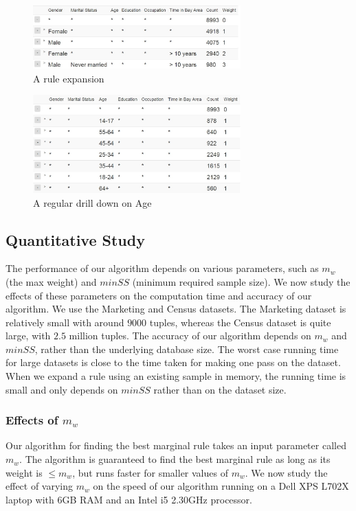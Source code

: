 \documentclass[10pt,journal,compsoc]{IEEEtran}
\begin{document}
\begin{figure}
\centering
\includegraphics[width=80mm,frame]{graphs/screenshots6col/empty_expansion.jpg}
\caption{A rule expansion \label{fig:uiexamplerule}}
\vspace{-10pt}
\end{figure}

\begin{figure}
\centering
\includegraphics[width=80mm,frame]{graphs/screenshots6col/age_drilldown.jpg}
\caption{A regular drill down on Age\label{fig:drilldownexample}}
\vspace{-10pt}
\end{figure}

\subsection{Quantitative Study}\label{sec:quantitative_study}
The performance of our algorithm depends on various parameters, such as $m_w$ (the max weight) and $minSS$ (minimum required sample size). We now study the effects of these parameters on the computation time and accuracy of our algorithm. We use the Marketing and Census datasets. The Marketing dataset is relatively small with around $9000$ tuples, whereas the Census dataset is quite large, with $2.5$ million tuples. The accuracy of our algorithm depends on $m_w$ and $minSS$, rather than the underlying database size. The worst case running time for large datasets is close to the time taken for making one pass on the dataset. When we expand a rule using an existing sample in memory, the running time is small and only depends on $minSS$ rather than on the dataset size.

\subsubsection{Effects of $m_w$}
Our algorithm for finding the best marginal rule takes an input parameter called $m_w$. The algorithm is guaranteed to find the best marginal rule as long as its weight is $\leq m_w$, but runs faster for smaller values of $m_w$. We now study the effect of varying $m_w$ on the speed of our algorithm running on a Dell XPS L702X laptop with 6GB RAM and an Intel i5 2.30GHz processor.
\end{document}
